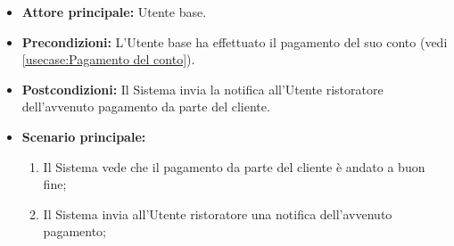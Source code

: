 \label{usecase:Notifica avvenuto pagamento}
\begin{itemize}
	\item \textbf{Attore principale:} Utente base.
	
	\item \textbf{Precondizioni:} L'Utente base ha effettuato il pagamento del suo conto (vedi \autoref{usecase:Pagamento del conto}).

    
	\item \textbf{Postcondizioni:} Il Sistema invia la notifica all'Utente ristoratore dell'avvenuto pagamento da parte del cliente.
     
	\item \textbf{Scenario principale:}
	      \begin{enumerate}
                \item Il Sistema vede che il pagamento da parte del cliente è andato a buon fine;
                \item Il Sistema invia all'Utente ristoratore una notifica dell'avvenuto pagamento;
	      \end{enumerate}
\end{itemize}